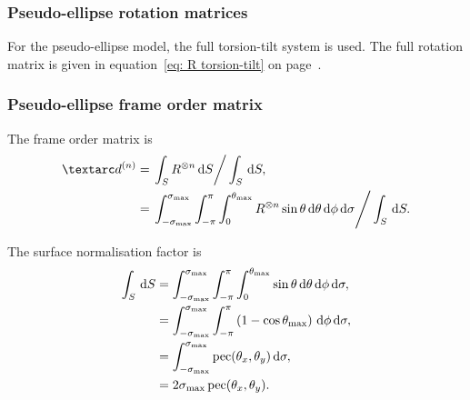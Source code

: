 \subsubsection{Pseudo-ellipse rotation matrices}

For the pseudo-ellipse model, the full torsion-tilt system is used.
The full rotation matrix is given in equation~\ref{eq: R torsion-tilt} on page~\pageref{eq: R torsion-tilt}.



\subsubsection{Pseudo-ellipse frame order matrix}

The frame order matrix is
\begin{subequations}
\begin{align}
    \FOn &= \left. \int_S R^{\otimes n} \diff S \right / \int_S \diff S, \\
         &= \left. \int_{-\conesmax}^{\conesmax} \int_{-\pi}^{\pi} \int_{0}^{\conethetamax} R^{\otimes n} \sin\theta \diff\theta \diff\phi \diff\sigma  \right / \int_S \diff S .
\end{align}
\end{subequations}

The surface normalisation factor is
\begin{subequations}
\begin{align}
    \int_S \,\mathrm{d} S &= \int_{-\sigma_\textrm{max}}^{\sigma_\textrm{max}} \int_{-\pi}^{\pi} \int_{0}^{\theta_\textrm{max}} \sin\theta \,\mathrm{d}\theta \,\mathrm{d}\phi \,\mathrm{d}\sigma , \\
                   &= \int_{-\sigma_\textrm{max}}^{\sigma_\textrm{max}} \int_{-\pi}^{\pi} \left( 1 - \cos\theta_\textrm{max} \right) \,\mathrm{d}\phi \,\mathrm{d}\sigma , \label{eq: pseudo-ellipse surface norm non-integratable} \\
                   &= \int_{-\sigma_\textrm{max}}^{\sigma_\textrm{max}} \operatorname{pec}(\theta_x, \theta_y) \,\mathrm{d}\sigma , \\
                   &= 2\sigma_\textrm{max} \operatorname{pec}(\theta_x, \theta_y) .
\end{align}
\end{subequations}


